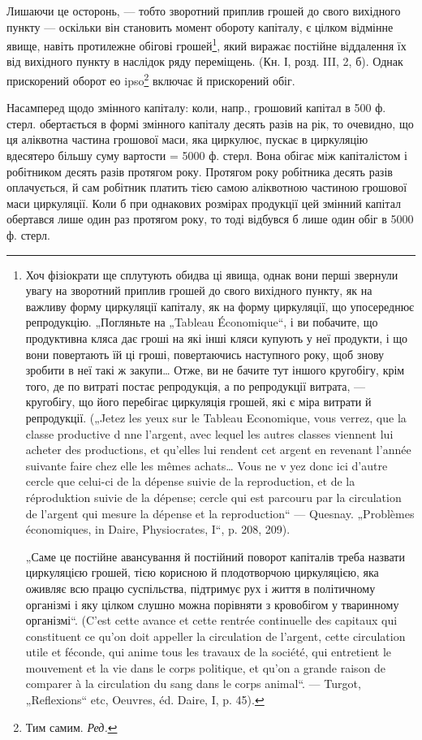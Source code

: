 Лишаючи це осторонь,  — тобто зворотний приплив
грошей до свого вихідного пункту — оскільки він становить момент
обороту капіталу, є цілком відмінне явище, навіть протилежне обігові
грошей\footnote{
Хоч фізіократи ще сплутують обидва ці явища, однак вони перші звернули
увагу на зворотний приплив грошей до свого вихідного пункту, як на важливу
форму циркуляції капіталу, як на форму циркуляції, що упосереднює репродукцію.
„Погляньте на „Tableau Économique“, і ви побачите, що продуктивна кляса дає
гроші на які інші кляси купують у неї продукти, і що вони повертають їй ці
гроші, повертаючись наступного року, щоб знову зробити в неї такі ж закупи\dots{}
Отже, ви не бачите тут іншого кругобігу, крім того, де по витраті
постає репродукція, а по репродукції витрата, — кругобігу, що його перебігає
циркуляція грошей, які є міра витрати й репродукції. („Jetez les yeux sur le
Tableau Economique, vous verrez, que la classe productive d nne l’argent,
avec lequel les autres classes viennent lui acheter des productions, et qu’elles lui
rendent cet argent en revenant l’année suivante faire chez elle les mêmes achats\dots{}
Vous ne v yez donc ici d’autre cercle que celui-ci de la dépense suivie de la reproduction,
et de la réproduktion suivie de la dépense; cercle qui est parcouru par la
circulation de l’argent qui mesure la dépense et la reproduction“ — Quesnay. „Problèmes
économiques, in Daire, Physiocrates, I“, p. 208, 209).

„Саме це постійне авансування й постійний поворот капіталів треба назвати
циркуляцією грошей, тією корисною й плодотворчою циркуляцією, яка оживляє
всю працю суспільства, підтримує рух і життя в політичному організмі і яку
цілком слушно можна порівняти з кровобігом у тваринному організмі“. (C’est
cette avance et cette rentrée continuelle des capitaux qui constituent ce qu’on doit
appeller la circulation de l’argent, cette circulation utile et féconde, qui anime tous
les travaux de la société, qui entretient le mouvement et la vie dans le corps politique,
et qu’on a grande raison de comparer à la circulation du sang dans le corps animal“.
— Turgot, „Reflexions“ etc, Oeuvres, éd. Daire, I, p. 45).}, який виражає постійне віддалення їх від вихідного
пункту в наслідок ряду переміщень. (Кн. І, розд. III, 2, б). Однак прискорений
оборот ео ipso\footnote*{
Тим самим. \emph{Ред.}
} включає й прискорений обіг.

Насамперед щодо змінного капіталу: коли, напр., грошовий капітал
в 500 ф. стерл. обертається в формі змінного капіталу десять разів на
рік, то очевидно, що ця аліквотна частина грошової маси, яка циркулює,
пускає в циркуляцію вдесятеро більшу суму вартости = 5000 ф. стерл.
Вона обігає між капіталістом і робітником десять разів протягом року.
Протягом року робітника десять разів оплачується, й сам робітник платить
тією самою аліквотною частиною грошової маси циркуляції. Коли
б при однакових розмірах продукції цей змінний капітал обертався
лише один раз протягом року, то тоді відбувся б лише один обіг
в 5000 ф. стерл.

